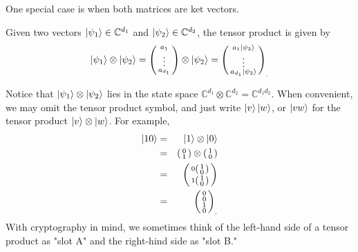 {\medskip

One special case is when both matrices are ket vectors. 

\begin{example}
Given two vectors $\ket{\psi_1}\in\mathbb{C}^{d_1}$ and $\ket{\psi_2}\in\mathbb{C}^{d_2}$, the tensor product is given by
\begin{equation}
\ket{\psi_1} \otimes\ket{\psi_2} = \left(\begin{smallmatrix} a_1\\ \vdots \\ a_{d_1}\end{smallmatrix}\right) \otimes \ket{\psi_2} = {\left(\begin{smallmatrix} a_1\ket{\psi_2}\\ \vdots \\a_{d_1}\ket{\psi_2}\end{smallmatrix}\right)}_.
\end{equation}
\end{example}
Notice that $\ket{\psi_1} \otimes\ket{\psi_2}$ lies in the state space $\mathbb{C}^{d_1}\otimes\mathbb{C}^{d_2}={\mathbb{C}}^{d_1 d_2}.$  When convenient, we may omit the tensor product symbol, and just write $\ket{v}\ket{w}$, or $\ket{vw}$ for the tensor product $\ket{v} \otimes \ket{w}$. For example, 
\begin{eqnarray*}
\ket{10}&=&\ket{1} \otimes \ket{0}\\
&=& \left(\begin{smallmatrix}0\\1\end{smallmatrix}\right) \otimes \left(\begin{smallmatrix}1\\0\end{smallmatrix}\right)\\ 
&=& \left(\begin{smallmatrix}
0\left(\begin{smallmatrix}1\\0\end{smallmatrix}\right)\\
1\left(\begin{smallmatrix}1\\0\end{smallmatrix}\right)\end{smallmatrix}\right)\\
&=&{\left(\begin{smallmatrix}
0\\
0\\
1\\
0\end{smallmatrix}\right)}_.
\end{eqnarray*}
With cryptography in mind, we sometimes think of the left-hand side of a tensor product as "slot A" and the right-hind side as "slot B."


}
